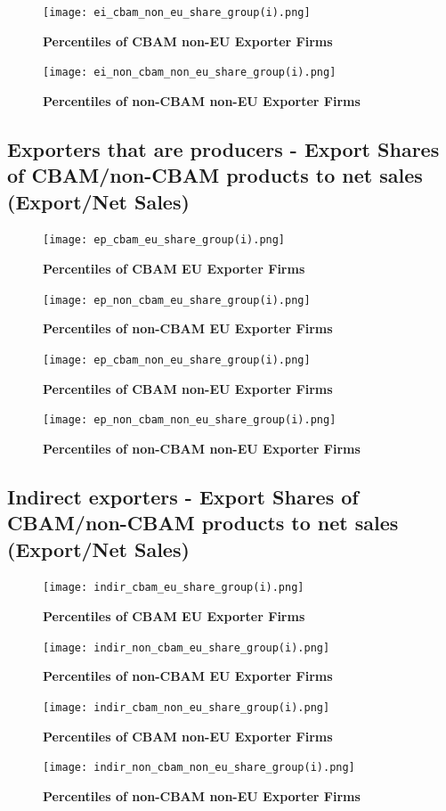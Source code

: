 \documentclass{article}
\begin{document}
\begin{figure}[H]
\centering
\texttt{[image: ei\_cbam\_non\_eu\_share\_group(i).png]}
\caption{\textbf{Percentiles of CBAM non-EU Exporter Firms}}
\texttt{[image: ei\_non\_cbam\_non\_eu\_share\_group(i).png]}
\caption{\textbf{Percentiles of non-CBAM non-EU Exporter Firms}}
\end{figure}

\subsection{Exporters that are producers - Export Shares of CBAM/non-CBAM products to net sales (Export/Net Sales)}
\begin{figure}[H]
\centering
\texttt{[image: ep\_cbam\_eu\_share\_group(i).png]}
\caption{\textbf{Percentiles of CBAM EU Exporter Firms}}
\texttt{[image: ep\_non\_cbam\_eu\_share\_group(i).png]}
\caption{\textbf{Percentiles of non-CBAM EU Exporter Firms}}
\end{figure}

\begin{figure}[H]
\centering
\texttt{[image: ep\_cbam\_non\_eu\_share\_group(i).png]}
\caption{\textbf{Percentiles of CBAM non-EU Exporter Firms}}
\texttt{[image: ep\_non\_cbam\_non\_eu\_share\_group(i).png]}
\caption{\textbf{Percentiles of non-CBAM non-EU Exporter Firms}}
\end{figure}

\subsection{Indirect exporters - Export Shares of CBAM/non-CBAM products to net sales (Export/Net Sales)}

\begin{figure}[H]
\centering
\texttt{[image: indir\_cbam\_eu\_share\_group(i).png]}
\caption{\textbf{Percentiles of CBAM EU Exporter Firms}}
\texttt{[image: indir\_non\_cbam\_eu\_share\_group(i).png]}
\caption{\textbf{Percentiles of non-CBAM EU Exporter Firms}}
\end{figure}

\begin{figure}[H]
\centering
\texttt{[image: indir\_cbam\_non\_eu\_share\_group(i).png]}
\caption{\textbf{Percentiles of CBAM non-EU Exporter Firms}}
\texttt{[image: indir\_non\_cbam\_non\_eu\_share\_group(i).png]}
\caption{\textbf{Percentiles of non-CBAM non-EU Exporter Firms}}
\end{figure}
\end{document}
